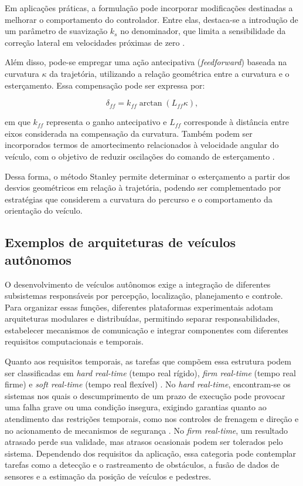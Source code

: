 Em aplicações práticas, a formulação pode incorporar modificações destinadas a melhorar o comportamento do controlador. Entre elas, destaca-se a introdução de um parâmetro de suavização $k_s$ no denominador, que limita a sensibilidade da correção lateral em velocidades próximas de zero \citep{Hoffmann2007}. 

Além disso, pode-se empregar uma ação antecipativa (\textit{feedforward}) baseada na curvatura $\kappa$ da trajetória, utilizando a relação geométrica entre a curvatura e o esterçamento. Essa compensação pode ser expressa por: 

\begin{equation}
    \delta_{ff} =
    k_{ff}\arctan(L_{ff}\kappa),
    \label{eq:stanley_feedforward}
\end{equation}

em que $k_{ff}$ representa o ganho antecipativo e $L_{ff}$ corresponde à distância entre eixos considerada na compensação da curvatura. Também podem ser incorporados termos de amortecimento relacionados à velocidade angular do veículo, com o objetivo de reduzir oscilações do comando de esterçamento \citep{Hoffmann2007}. 

Dessa forma, o método Stanley permite determinar o esterçamento a partir dos desvios geométricos em relação à trajetória, podendo ser complementado por estratégias que considerem a curvatura do percurso e o comportamento da orientação do veículo. 

\subsection{Exemplos de arquiteturas de veículos autônomos}
\label{subsec:arquiteturas_referencia}

O desenvolvimento de veículos autônomos exige a integração de diferentes subsistemas responsáveis por percepção, localização, planejamento e controle. Para organizar essas funções, diferentes plataformas experimentais adotam arquiteturas modulares e distribuídas, permitindo separar responsabilidades, estabelecer mecanismos de comunicação e integrar componentes com diferentes requisitos computacionais e temporais.

Quanto aos requisitos temporais, as tarefas que compõem essa estrutura podem ser classificadas em \textit{hard real-time} (tempo real rígido), \textit{firm real-time} (tempo real firme) e \textit{soft real-time} (tempo real flexível) \citep{Buttazzo2011}. No \textit{hard real-time}, encontram-se os sistemas nos quais o descumprimento de um prazo de execução pode provocar uma falha grave ou uma condição insegura, exigindo garantias quanto ao atendimento das restrições temporais, como nos controles de frenagem e direção e no acionamento de mecanismos de segurança \citep{Bonci2026}. No \textit{firm real-time}, um resultado atrasado perde sua validade, mas atrasos ocasionais podem ser tolerados pelo sistema. Dependendo dos requisitos da aplicação, essa categoria pode contemplar tarefas como a detecção e o rastreamento de obstáculos, a fusão de dados de sensores e a estimação da posição de veículos e pedestres.

